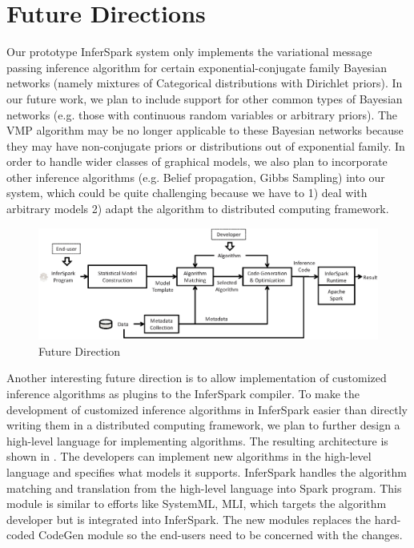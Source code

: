 \section{Future Directions}
\label{sec:future}

Our prototype InferSpark system only implements the variational message
passing inference algorithm for certain exponential-conjugate family Bayesian
networks (namely mixtures of Categorical distributions with Dirichlet priors).
In our future work, we plan to include support for other common types of
Bayesian networks (e.g. those with continuous random variables or arbitrary
priors). The VMP algorithm may be no longer applicable to these Bayesian
networks because they may have non-conjugate priors or distributions out of
exponential family. In order to handle wider classes of graphical models, we
also plan to incorporate other inference algorithms (e.g. Belief propagation,
Gibbs Sampling) into our system, which could be quite challenging because we
have to 1) deal with arbitrary models 2) adapt the algorithm to distributed
computing framework.

\begin{figure}[th]
\centering
    \includegraphics[width=0.8\linewidth]{figs/workflow_future.eps}
    \caption{Future Direction}
    \label{fig:workflow_future}
\end{figure}

Another interesting future direction is to allow implementation of customized
inference algorithms as plugins to the InferSpark compiler. To make the
development of customized inference algorithms in InferSpark easier than
directly writing them in a distributed computing framework, we plan to further
design a high-level language for implementing algorithms. The resulting
architecture is shown in . The developers can
implement new algorithms in the high-level language and specifies what models
it supports. InferSpark handles the algorithm matching and translation from
the high-level language into Spark program. This module is similar to efforts
like SystemML, MLI, which targets the algorithm developer but is integrated
into InferSpark. The new modules replaces the hard-coded CodeGen module so the
end-users need to be concerned with the changes.


